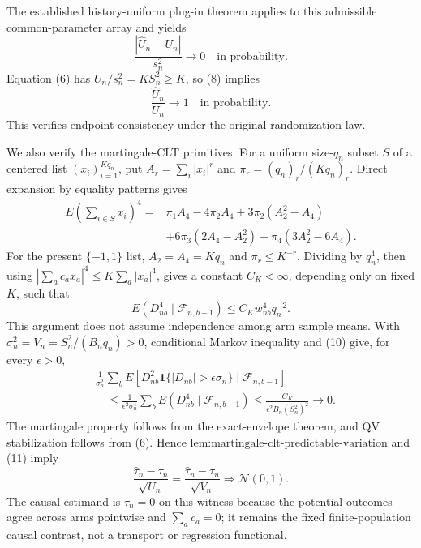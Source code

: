 The established history-uniform plug-in theorem applies to this admissible common-parameter array and yields
\[
\frac{|\widehat U_n-U_n|}{s_n^2}\longrightarrow0
\quad\text{in probability}.
\tag{8}
\]
Equation (6) has \(U_n/s_n^2=KS_n^2\ge K\), so (8) implies
\[
\frac{\widehat U_n}{U_n}\longrightarrow1
\quad\text{in probability}.
\tag{9}
\]
This verifies endpoint consistency under the original randomization law.

We also verify the martingale-CLT primitives.  For a uniform size-\(q_n\) subset \(S\) of a centered list \((x_i)_{i=1}^{Kq_n}\), put \(A_r=\sum_i|x_i|^r\) and \(\pi_r=(q_n)_r/(Kq_n)_r\).  Direct expansion by equality patterns gives
\[
\begin{aligned}
E\left(\sum_{i\in S}x_i\right)^4
={}&\pi_1A_4-4\pi_2A_4+3\pi_2(A_2^2-A_4)\\
&+6\pi_3(2A_4-A_2^2)+\pi_4(3A_2^2-6A_4).
\end{aligned}
\]
For the present \(\{-1,1\}\) list, \(A_2=A_4=Kq_n\) and \(\pi_r\le K^{-r}\).  Dividing by \(q_n^4\), then using \(|\sum_ac_ax_a|^4\le K\sum_a|x_a|^4\), gives a constant \(C_K<\infty\), depending only on fixed \(K\), such that
\[
E(D_{nb}^4\mid\mathcal F_{n,b-1})
\le C_Kw_{nb}^4q_n^{-2}.
\tag{10}
\]
This argument does not assume independence among arm sample means.  With \(\sigma_n^2=V_n=S_n^2/(B_nq_n)>0\), conditional Markov inequality and (10) give, for every \(\epsilon>0\),
\[
\begin{aligned}
&\frac1{\sigma_n^2}\sum_bE\!\left[D_{nb}^2
 \mathbf1\{|D_{nb}|>\epsilon\sigma_n\}\mid\mathcal F_{n,b-1}\right]\\
&\quad\le\frac1{\epsilon^2\sigma_n^4}\sum_bE(D_{nb}^4\mid\mathcal F_{n,b-1})
\le\frac{C_K}{\epsilon^2B_n(S_n^2)^2}\longrightarrow0.
\end{aligned}
\tag{11}
\]
The martingale property follows from the exact-envelope theorem, and QV stabilization follows from (6).  Hence \(\text{lem:martingale-clt-predictable-variation}\) and (11) imply
\[
\frac{\widehat\tau_n-\tau_n}{\sqrt{U_n}}
=\frac{\widehat\tau_n-\tau_n}{\sqrt{V_n}}
\Rightarrow\mathcal N(0,1).
\tag{12}
\]
The causal estimand is \(\tau_n=0\) on this witness because the potential outcomes agree across arms pointwise and \(\sum_ac_a=0\); it remains the fixed finite-population causal contrast, not a transport or regression functional.

